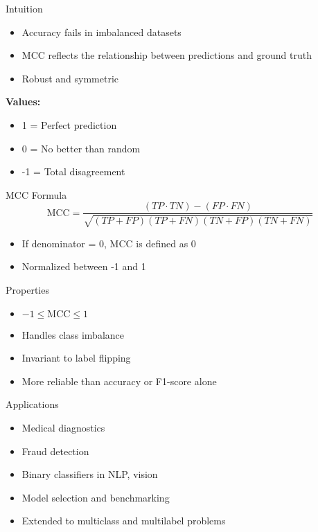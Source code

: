 \documentclass{beamer}
\begin{document}
\begin{frame}{Intuition}
  \begin{itemize}
    \item Accuracy fails in imbalanced datasets
    \item MCC reflects the relationship between predictions and ground truth
    \item Robust and symmetric
  \end{itemize}
  \vspace{0.5em}
  \textbf{Values:}
  \begin{itemize}
    \item 1 = Perfect prediction
    \item 0 = No better than random
    \item -1 = Total disagreement
  \end{itemize}
\end{frame}

\begin{frame}{MCC Formula}
  \[
    \text{MCC} = \frac{(TP \cdot TN) - (FP \cdot FN)}{
    \sqrt{(TP + FP)(TP + FN)(TN + FP)(TN + FN)}}
  \]
  \begin{itemize}
    \item If denominator = 0, MCC is defined as 0
    \item Normalized between -1 and 1
  \end{itemize}
\end{frame}

\begin{frame}{Properties}
  \begin{itemize}
    \item \(-1 \leq \text{MCC} \leq 1\)
    \item Handles class imbalance
    \item Invariant to label flipping
    \item More reliable than accuracy or F1-score alone
  \end{itemize}
\end{frame}

\begin{frame}{Applications}
  \begin{itemize}
    \item Medical diagnostics
    \item Fraud detection
    \item Binary classifiers in NLP, vision
    \item Model selection and benchmarking
    \item Extended to multiclass and multilabel problems
  \end{itemize}
\end{frame}
\end{document}
